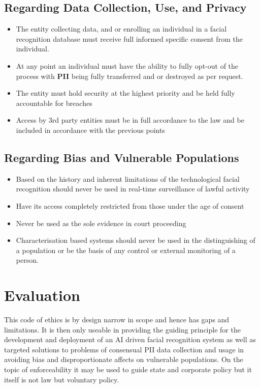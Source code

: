 \documentclass[11pt]{article}
\begin{document}
\subsection*{Regarding Data Collection, Use, and Privacy}
\begin{itemize}
    \item The entity collecting data, and or enrolling an individual in a facial recognition database must receive full informed specific consent from the individual.
    \item At any point an individual must have the ability to fully opt-out of the process with \textbf{PII} being fully transferred and or destroyed as per request.
    \item The entity must hold security at the highest priority and be held fully accountable for breaches
    \item Access by 3rd party entities must be in full accordance to the law and be included in accordance with the previous points   
\end{itemize}

\subsection*{Regarding Bias and Vulnerable Populations}
\begin{itemize}
    \item Based on the history and inherent limitations of the technological facial recognition should never be used in real-time surveillance of lawful activity
    \item Have its access completely restricted from those under the age of consent
    \item Never be used as the sole evidence in court proceeding
    \item Characterisation based systems should never be used in the distinguishing of a population or be the basis of any control or external monitoring of a person. 
\end{itemize}

\section{Evaluation}
This code of ethics is by design narrow in scope and hence has gaps and limitations. It is then only useable in providing the guiding principle for the development and deployment of an AI driven facial recognition system as well as targeted solutions to problems of consensual PII data collection and usage in avoiding bias and disproportionate affects on vulnerable populations. On the topic of enforceability it may be used to guide state and corporate policy but it itself is not law but voluntary policy.  


\newpage


\end{document}
